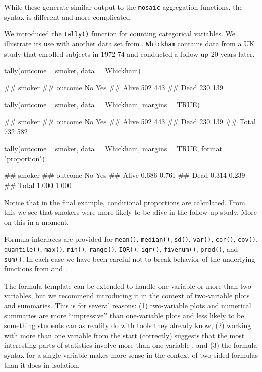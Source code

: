 While these generate similar output to the \texttt{mosaic} aggregation
functions, the syntax is different and more complicated.

We introduced the \texttt{tally()} function for counting categorical
variables. We illustrate its use with another data set from
 \citep{mosaicData}. \texttt{Whickham} contains data
from a UK study that enrolled subjects in 1972-74 and conducted a
follow-up 20 years later.

\begin{Schunk}
\begin{Sinput}
tally(outcome ~ smoker, data = Whickham)
\end{Sinput}
\begin{Soutput}
##        smoker
## outcome  No Yes
##   Alive 502 443
##   Dead  230 139
\end{Soutput}
\begin{Sinput}
tally(outcome ~ smoker, data = Whickham, margins = TRUE)
\end{Sinput}
\begin{Soutput}
##        smoker
## outcome  No Yes
##   Alive 502 443
##   Dead  230 139
##   Total 732 582
\end{Soutput}
\begin{Sinput}
tally(outcome ~ smoker, data = Whickham, margins = TRUE, format = "proportion")
\end{Sinput}
\begin{Soutput}
##        smoker
## outcome    No   Yes
##   Alive 0.686 0.761
##   Dead  0.314 0.239
##   Total 1.000 1.000
\end{Soutput}
\end{Schunk}

Notice that in the final example, conditional proportions are
calculated. From this we see that smokers were more likely to be alive
in the follow-up study. More on this in a moment.

Formula interfaces are provided for \texttt{mean()}, \texttt{median()},
\texttt{sd()}, \texttt{var()}, \texttt{cor()}, \texttt{cov()},
\texttt{quantile()}, \texttt{max()}, \texttt{min()}, \texttt{range()},
\texttt{IQR()}, \texttt{iqr()}, \texttt{fivenum()}, \texttt{prod()}, and
\texttt{sum()}. In each case we have been careful not to break behavior
of the underlying functions from  and .

The formula template can be extended to handle one variable or more than
two variables, but we recommend introducing it in the context of
two-variable plots and summaries. This is for several reasons: (1)
two-variable plots and numerical summaries are more ``impressive'' than
one-variable plots and less likely to be something students can as
readily do with tools they already know, (2) working with more than one
variable from the start (correctly) suggests that the most interesting
parts of statistics involve more than one variable
\citep{Wild:RSS:2011}, and (3) the formula syntax for a single variable
makes more sense in the context of two-sided formulas than it does in
isolation.

